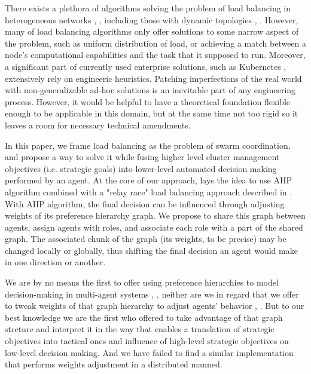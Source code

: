 
There exists a plethora of algorithms solving the problem of load balancing in heterogeneous networks \cite{gamal-2019}, \cite{adhikari-2018}, including those with dynamic topologies \cite{sahoo-2020}, \cite{zhang-2018}.
However, many of load balancing algorithms only offer solutions to some narrow aspect of the problem, such as uniform distribution of load, or achieving a match between a node's computational capabilities and the task that it supposed to run.
Moreover, a significant part of currently used enterprise solutions, such as Kubernetes \cite{kubernet17}, extensively rely on engineeric heuristics.
Patching imperfections of the real world with non-generalizable ad-hoc solutions is an inevitable part of any engineering process.
However, it would be helpful to have a theoretical foundation flexible enough to be applicable in this domain, but at the same time not too rigid so it leaves a room for necessary technical amendments.

In this paper, we frame load balancing as the problem of swarm coordination, and propose a way to solve it while fusing higher level cluster management objectives (i.e. strategic goals) into lower-level automated decision making performed by an agent.
At the core of our approach, lays the idea to use AHP \cite{saaty-2008} algorithm combined with a "relay race" load balancing approach described in \cite{gorodetskii-2012}.
With AHP algorithm, the final decision can be influenced through adjusting weights of its preference hierarchy graph.
We propose to share this graph between agents, assign agents with roles, and associate each role with a part of the shared graph.
The associated chunk of the graph (its weights, to be precise) may be changed locally or globally, thus shifting the final decision an agent would make in one direction or another.

We are by no means the first to offer using preference hierarchies to model decision-making in multi-agent systems \cite{cartvehishvili-2018-model}, \cite{drakaki-2018-intelligent}, neither are we in regard that we offer to tweak weights of that graph hierarchy to adjust agents' behavior \cite{zytniewski-2016-application}, \cite{brintrup-2010-behaviour}.
But to our best knowledge we are the first who offered to take advantage of that graph strcture and interpret it in the way that enables a translation of strategic objectives into tactical ones and influence of high-level strategic objectives on low-level decision making.
And we have failed to find a similar implementation that performs weights adjustment in a distributed manned.

